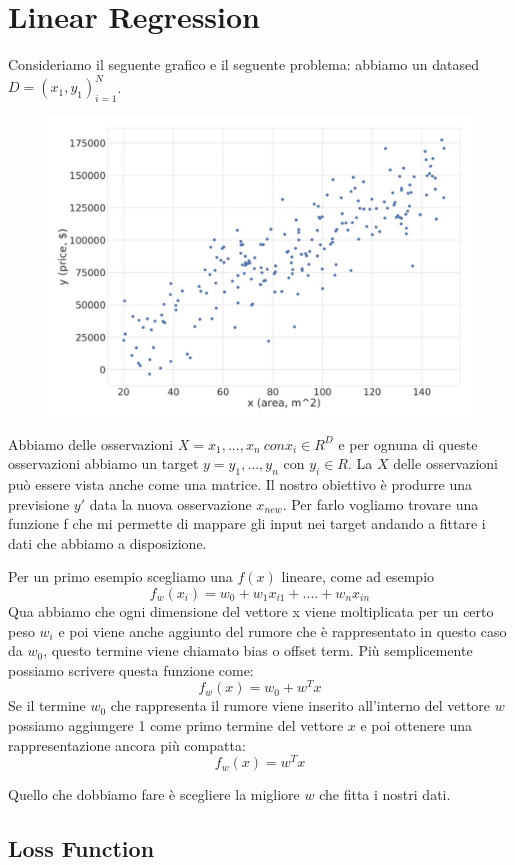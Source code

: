\documentclass[14pt]{extreport}
\begin{document}
\chapter{Linear Regression}

Consideriamo il seguente grafico e il seguente problema: abbiamo un datased $D={(x_1,y_1)}_{i=1}^N$.

\begin{figure}[H]
\centering
\includegraphics[width=0.7\linewidth]{64.jpeg}
\end{figure}

Abbiamo delle osservazioni $X = {x_1,...,x_n} \ con x_i \in R^D$ e per ognuna di queste osservazioni abbiamo un target $y = {y_1, ..., y_n}$ con $y_i
\in R$. La $X$ delle osservazioni può essere vista anche come una matrice. Il nostro obiettivo è produrre una previsione $y'$ data la nuova
osservazione $x_{new}$. Per farlo vogliamo trovare una funzione f che mi permette di mappare gli input nei target andando a fittare i dati che abbiamo
a disposizione.

Per un primo esempio scegliamo una $f(x)$ lineare, come ad esempio $$f_w(x_i) = w_0 + w_1x_{i1} + .... + w_nx_{in}$$ Qua abbiamo che ogni dimensione
del vettore x viene moltiplicata per un certo peso $w_i$ e poi viene anche aggiunto del rumore che è rappresentato in questo caso da $w_0$, questo
termine viene chiamato bias o offset term. Più semplicemente possiamo scrivere questa funzione come:
$$f_w(x) = w_0 + w^Tx$$ Se il termine $w_0$ che rappresenta il rumore viene inserito all'interno del vettore $w$ possiamo aggiungere 1 come primo
termine del vettore $x$ e poi ottenere una rappresentazione ancora più compatta: $$f_w(x) = w^Tx$$

Quello che dobbiamo fare è scegliere la migliore $w$ che fitta i nostri dati.

\section{Loss Function}
\end{document}
